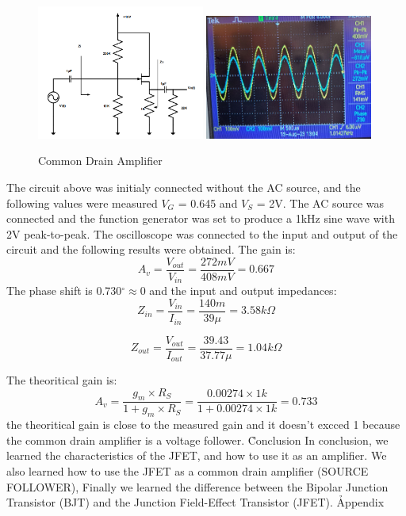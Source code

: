 \documentclass[12pt]{article}
\begin{document}
\begin{figure}[H]
    \centering
    \includegraphics[width=0.49\textwidth]{assets/main/2023-08-25-18-33-54.png}
    \includegraphics[width=0.49\textwidth]{assets//main/2023-08-25-18-42-04.png}
    \caption{Common Drain Amplifier}
\end{figure}
The circuit above was initialy connected without the AC source, and the following values were measured $V_G$ = 0.645 and $V_S$ = 2V. The AC source was connected and the function generator was set to produce a 1kHz sine wave with 2V peak-to-peak. The oscilloscope was connected to the input and output of the circuit and the following results were obtained.
The gain is:
\begin{equation}
    A_v = \frac{V_{out}}{V_{in}} = \frac{272mV}{408mV} = 0.667
\end{equation}
The phase shift is 0.730$^{\circ} \approx 0$ and the input and output impedances:
\begin{equation}
    Z_{in} = \frac{V_{in}}{I_{in}} = \frac{140m}{39 \mu} = 3.58 k\Omega
\end{equation}
  
\begin{equation}
    Z_{out} = \frac{V_{out}}{I_{out}} = \frac{39.43}{37.77 \mu} = 1.04k\Omega
\end{equation}

The theoritical gain is:
\begin{equation}
    A_v = \frac{g_m\times R_S}{1 + g_m\times R_S} = \frac{0.00274\times 1k}{1 + 0.00274\times 1k} =  0.733
\end{equation}
the theoritical gain is close to the measured gain and it doesn't excced 1 because the common drain amplifier is a voltage follower.
\clearpage
\h{Conclusion}
In conclusion, we learned the characteristics of the JFET, and how to use it as an amplifier. We also learned how to use the JFET as a common drain amplifier (SOURCE FOLLOWER), Finally we learned the difference between the Bipolar Junction Transistor (BJT) and the Junction Field-Effect Transistor (JFET).
\clearpage
{}
\clearpage
\h*{Appendix}

\clearpage
\end{document}
